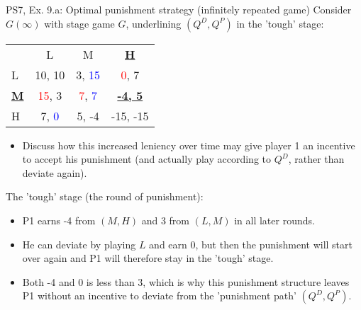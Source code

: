 \begin{frame}{PS7, Ex. 9.a: Optimal punishment strategy (infinitely repeated game)}
    Consider $G(\infty)$ with stage game $G$, underlining $(Q^D,Q^P)$ in the 'tough' stage: \vspace{-6pt}
    \begin{table}
      \begin{tabular}{l|c|c|c|}
        \multicolumn{1}{c}{} & \multicolumn{1}{c}{L} & \multicolumn{1}{c}{M} & \multicolumn{1}{c}{\textbf{\underline{H}}} \\\cline{2-4}
        L & 10, 10 & 3, \textcolor{blue}{15} & \textcolor{red}{0}, 7 \\\cline{2-4}
        \textbf{\underline{M}} & \textcolor{red}{15}, 3 & \textcolor{red}{7}, \textcolor{blue}{7} & \textbf{\underline{-4, 5}} \\\cline{2-4}
        H & 7, \textcolor{blue}{0} & 5, -4 & -15, -15 \\\cline{2-4}
      \end{tabular}
    \end{table}
    \vspace{-4pt}
    \begin{itemize}
      \item[(a)] Discuss how this increased leniency over time may give player 1 an incentive to accept his punishment (and actually play according to $Q^D$, rather than deviate again).
    \end{itemize}
    \vspace{-8pt}
  \begin{multicols}{2}
    The 'tough' stage (the  round of punishment):\vspace{-4pt}
    \begin{itemize}
      \item P1 earns -4 from $(M, H)$ and 3 from $(L, M)$ in all later rounds.
      \item He can deviate by playing $L$ and earn 0, but then the punishment will start over again and P1 will therefore stay in the 'tough' stage.
      \item Both -4 and 0 is less than 3, which is why this punishment structure leaves P1 without an incentive to deviate from the 'punishment path' $(Q^D,Q^P)$.
    \end{itemize}
    \vfill\null\columnbreak
    \vfill\null
  \end{multicols}
\end{frame}
